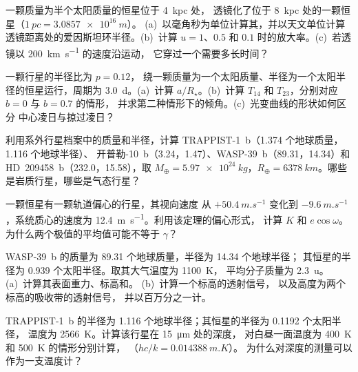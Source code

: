 \begin{exercise}[$\star$]\label{exo:b3:exoplanets:4}
一颗质量为半个太阳质量的恒星位于 \qty{4}{kpc} 处，
透镜化了位于 \qty{8}{kpc} 处的一颗恒星（$\qty{1}{pc} = \qty{3.0857e16}{m}$）。
(a)~以毫角秒为单位计算其，并以天文单位计算
透镜距离处的爱因斯坦环半径。(b)~计算
$u = 1$、$0.5$ 和 $0.1$ 时的放大率。(c)~若透镜以
\qty{200}{km.s^{-1}} 的速度沿运动，
它穿过一个需要多长时间？
\end{exercise}

\begin{exercise}[$\star\star$]\label{exo:b3:exoplanets:5}
一颗行星的半径比为 $p = 0.12$，
绕一颗质量为一个太阳质量、半径为一个太阳半径的恒星运行，周期为 \qty{3.0}{d}。(a)~计算 $a/R_\star$。(b)~计算
$T_{14}$ 和 $T_{23}$，分别对应 $b = 0$ 与 $b = 0.7$ 的情形，
并求第二种情形下的倾角。(c)~光变曲线的形状如何区分
中心凌日与掠过凌日？
\end{exercise}

\begin{exercise}[$\star\star$]\label{exo:b3:exoplanets:6}
利用系外行星档案中的质量和半径，计算
TRAPPIST-1~b（1.374 个地球质量，1.116 个地球半径）、
开普勒-10~b（3.24，1.47）、WASP-39~b（89.31，14.34）和
HD~209458~b（232.0，15.58），取 $M_\oplus = \qty{5.97e24}{kg}$，$R_\oplus =
\qty{6378}{km}$。哪些是岩质行星，哪些是气态行星？
\end{exercise}

\begin{exercise}[$\star\star$]\label{exo:b3:exoplanets:7}
一颗恒星有一颗轨道偏心的行星，其视向速度
从 $+\qty{50.4}{m.s^{-1}}$ 变化到 $-\qty{9.6}{m.s^{-1}}$，系统质心的速度为
\qty{12.4}{m.s^{-1}}。利用该定理的偏心形式，
计算 $K$ 和 $e\cos\omega$。
为什么两个极值的平均值可能不等于 $\gamma$？
\end{exercise}

\begin{exercise}[$\star\star$]\label{exo:b3:exoplanets:8}
WASP-39~b 的质量为 89.31 个地球质量，半径为 14.34 个地球半径；
其恒星的半径为 0.939 个太阳半径。取其大气温度为 \qty{1100}{K}，
平均分子质量为 \qty{2.3}{u}。(a)~计算其表面重力、标高和。
(b)~计算一个标高的透射信号，
以及高度为两个标高的吸收带的透射信号，
并以百万分之一计。
\end{exercise}

\begin{exercise}[$\star\star$]\label{exo:b3:exoplanets:9}
TRAPPIST-1~b 的半径为 1.116 个地球半径；其恒星的半径为 0.1192 个太阳半径，
温度为 \qty{2566}{K}。计算该行星在 \qty{15}{\micro m} 处的深度，
对白昼一面温度为 \qty{400}{K} 和 \qty{500}{K} 的情形分别计算，
（$hc/k = \qty{0.014388}{m.K}$）。
为什么对深度的测量可以作为一支温度计？
\end{exercise}

